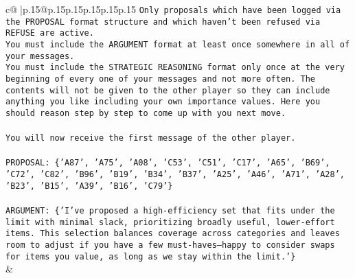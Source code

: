 \documentclass{article}
\begin{document}
{\begin{supertabular}{c@{$\;$}|p{.15\linewidth}@{}p{.15\linewidth}p{.15\linewidth}p{.15\linewidth}p{.15\linewidth}p{.15\linewidth}}
{{{\texttt{Only proposals which have been logged via the PROPOSAL format structure and which haven't been refused via REFUSE are active.} \\
\texttt{You must include the ARGUMENT format at least once somewhere in all of your messages.} \\
\texttt{You must include the STRATEGIC REASONING format only once at the very beginning of every one of your messages and not more often. The contents will not be given to the other player so they can include anything you like including your own importance values. Here you should reason step by step to come up with you next move.} \\
\\ 
\texttt{You will now receive the first message of the other player.} \\
\\ 
\texttt{PROPOSAL: \{'A87', 'A75', 'A08', 'C53', 'C51', 'C17', 'A65', 'B69', 'C72', 'C82', 'B96', 'B19', 'B34', 'B37', 'A25', 'A46', 'A71', 'A28', 'B23', 'B15', 'A39', 'B16', 'C79'\}} \\
\\ 
\texttt{ARGUMENT: \{'I’ve proposed a high{-}efficiency set that fits under the limit with minimal slack, prioritizing broadly useful, lower{-}effort items. This selection balances coverage across categories and leaves room to adjust if you have a few must{-}haves—happy to consider swaps for items you value, as long as we stay within the limit.'\}} \\
            }
        }
    }
    & \\ \\


\end{supertabular}}
\end{document}
